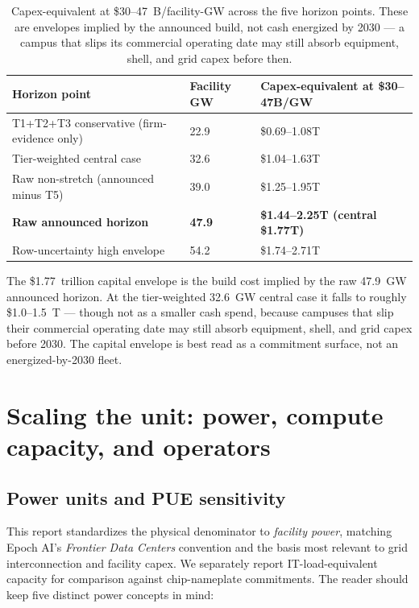 \documentclass[11pt,a4paper]{article}
\begin{document}
\begin{table}[h]
\centering
\small
\begin{tabular}{@{}L{6.4cm}R{2.0cm}R{3.6cm}@{}}
\toprule
\textbf{Horizon point} & \textbf{Facility GW} & \textbf{Capex-equivalent at \$30--47B/GW} \\
\midrule
T1+T2+T3 conservative (firm-evidence only) & 22.9 & \$0.69--1.08T \\
Tier-weighted central case & 32.6 & \$1.04--1.63T \\
Raw non-stretch (announced minus T5) & 39.0 & \$1.25--1.95T \\
\textbf{Raw announced horizon} & \textbf{47.9} & \textbf{\$1.44--2.25T (central \$1.77T)} \\
Row-uncertainty high envelope & 54.2 & \$1.74--2.71T \\
\bottomrule
\end{tabular}
\caption{Capex-equivalent at \$30--47~B/facility-GW across the five horizon points. These are envelopes implied by the announced build, not cash energized by 2030 --- a campus that slips its commercial operating date may still absorb equipment, shell, and grid capex before then.}
\label{tab:scaling-the-unit}
\end{table}

The \$1.77~trillion capital envelope is the build cost implied by the raw 47.9~GW announced horizon. At the tier-weighted 32.6~GW central case it falls to roughly \$1.0--1.5~T --- though not as a smaller cash spend, because campuses that slip their commercial operating date may still absorb equipment, shell, and grid capex before 2030. The capital envelope is best read as a commitment surface, not an energized-by-2030 fleet.

\section{Scaling the unit: power, compute capacity, and operators}
\label{sec:scale-body}


\subsection{Power units and PUE sensitivity}
\label{subsec:power-units}

This report standardizes the physical denominator to \emph{facility power}, matching Epoch AI's \emph{Frontier Data Centers} convention and the basis most relevant to grid interconnection and facility capex. We separately report IT-load-equivalent capacity for comparison against chip-nameplate commitments. The reader should keep five distinct power concepts in mind:
\end{document}
